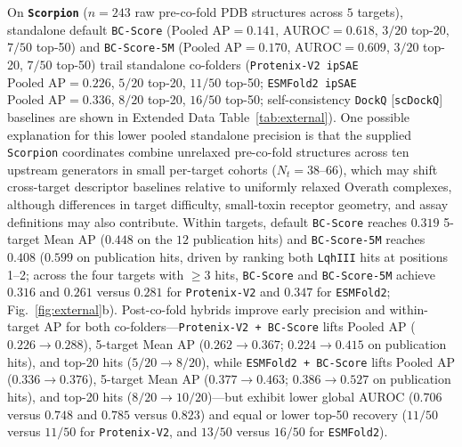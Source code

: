 \documentclass[10pt,twocolumn]{article}
\begin{document}
On \textbf{\texttt{Scorpion}} ($n=243$ raw pre-co-fold PDB structures across $5$ targets), standalone default \texttt{BC-Score} ($\text{Pooled AP} = 0.141$, $\text{AUROC} = 0.618$, $3/20$ top-20, $7/50$ top-50) and \texttt{BC-Score-5M} ($\text{Pooled AP} = 0.170$, $\text{AUROC} = 0.609$, $3/20$ top-20, $7/50$ top-50) trail standalone co-folders (\texttt{Protenix-V2 ipSAE} \cite{bytedance2025protenix} $\text{Pooled AP} = 0.226$, $5/20$ top-20, $11/50$ top-50; \texttt{ESMFold2 ipSAE} \cite{candido2026esmfold2} $\text{Pooled AP} = 0.336$, $8/20$ top-20, $16/50$ top-50; self-consistency \texttt{DockQ} [\texttt{scDockQ}] \cite{basu2016dockq} baselines are shown in Extended Data Table~\ref{tab:external}). One possible explanation for this lower pooled standalone precision is that the supplied \texttt{Scorpion} coordinates combine unrelaxed pre-co-fold structures across ten upstream generators in small per-target cohorts ($N_t = 38\text{--}66$), which may shift cross-target descriptor baselines relative to uniformly relaxed Overath complexes, although differences in target difficulty, small-toxin receptor geometry, and assay definitions may also contribute. Within targets, default \texttt{BC-Score} reaches $0.319$ 5-target Mean AP ($0.448$ on the $12$ publication hits) and \texttt{BC-Score-5M} reaches $0.408$ ($0.599$ on publication hits, driven by ranking both \texttt{LqhIII} hits at positions 1--2; across the four targets with $\ge 3$ hits, \texttt{BC-Score} and \texttt{BC-Score-5M} achieve $0.316$ and $0.261$ versus $0.281$ for \texttt{Protenix-V2} and $0.347$ for \texttt{ESMFold2}; Fig.~\ref{fig:external}b). Post-co-fold hybrids improve early precision and within-target AP for both co-folders---\texttt{Protenix-V2 + BC-Score} lifts Pooled AP ($0.226 \to 0.288$), 5-target Mean AP ($0.262 \to 0.367$; $0.224 \to 0.415$ on publication hits), and top-20 hits ($5/20 \to 8/20$), while \texttt{ESMFold2 + BC-Score} lifts Pooled AP ($0.336 \to 0.376$), 5-target Mean AP ($0.377 \to 0.463$; $0.386 \to 0.527$ on publication hits), and top-20 hits ($8/20 \to 10/20$)---but exhibit lower global AUROC ($0.706$ versus $0.748$ and $0.785$ versus $0.823$) and equal or lower top-50 recovery ($11/50$ versus $11/50$ for \texttt{Protenix-V2}, and $13/50$ versus $16/50$ for \texttt{ESMFold2}).
\end{document}
